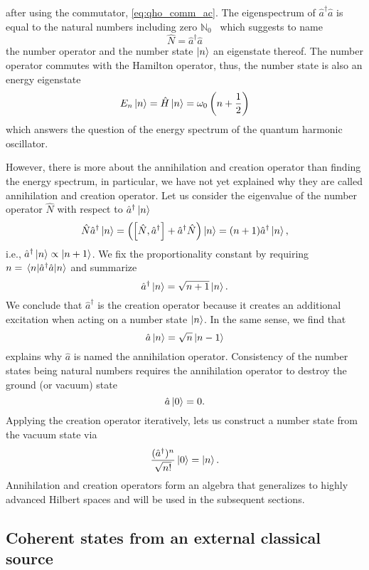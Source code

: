 after using the commutator, \cref{eq:qho_comm_ac}.
The eigenspectrum of $\hat{a}^\dagger\hat{a}$ is equal to the natural numbers including zero $\mathbb{N}_0$~\cite[p.~506]{Cohen2019} which suggests to name
\begin{equation}
    \hat{N}
    =
    \hat{a}^\dagger\hat{a}
    \label{eq:qho_number_operator}
\end{equation}
the number operator and the number state $\ket{n}$ an eigenstate thereof.
The number operator commutes with the Hamilton operator, thus, the number state is also an energy eigenstate
\begin{equation}
    E_n\ket{n}
    =
    \hat{H}\ket{n}
    =
    \omega_0\left(n+\frac{1}{2}\right)
    \label{eq:qho_number_energy}
\end{equation}
which answers the question of the energy spectrum of the quantum harmonic oscillator.

However, there is more about the annihilation and creation operator than finding the energy spectrum, in particular, we have not yet explained why they are called annihilation and creation operator.
Let us consider the eigenvalue of the number operator $\hat{N}$ with respect to $\hat{a}^\dagger\ket{n}$
\begin{equation}
    \hat{N}\hat{a}^\dagger\ket{n}
    =
    \left(\comm{\hat{N}}{\hat{a}^\dagger}+\hat{a}^\dagger\hat{N}\right)\ket{n}
    =
    (n+1)\hat{a}^\dagger\ket{n}
    ,
\end{equation}
i.e., $\hat{a}^\dagger\ket{n}\propto\ket{n+1}$.
We fix the proportionality constant by requiring $n=\expval{\hat{a}^\dagger\hat{a}}{n}$ and summarize
\begin{equation}
    \hat{a}^\dagger\ket{n}
    =
    \sqrt{n+1}\ket{n}
    \label{eq:qho_creation}.
\end{equation}
We conclude that $\hat{a}^\dagger$ is the creation operator because it creates an additional excitation when acting on a number state $\ket{n}$.
In the same sense, we find that
\begin{equation}
    \hat{a}\ket{n}
    =
    \sqrt{n}\ket{n-1}
    \label{eq:qho_annhiliation}
\end{equation}
explains why $\hat{a}$ is named the annihilation operator.
Consistency of the number states being natural numbers requires the annihilation operator to destroy the ground (or vacuum) state
\begin{equation}
    \hat{a}\ket{0}
    =
    0
    \label{eq:qho_vacuum_annihilation}.
\end{equation}
Applying the creation operator iteratively, lets us construct a number state from the vacuum state via
\begin{equation}
    \frac{(\hat{a}^\dagger)^n}{\sqrt{n!}}\ket{0}
    =
    \ket{n}
    \label{eq:qho_creation_number}.
\end{equation}
Annihilation and creation operators form an algebra that generalizes to highly advanced Hilbert spaces and will be used in the subsequent sections.

\subsection{Coherent states from an external classical source}